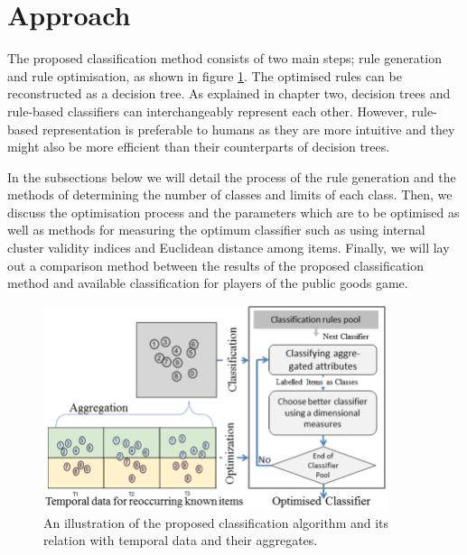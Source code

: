 \section{Approach}

The proposed classification method consists of two main steps; rule generation and rule optimisation, as shown in figure  \ref{fig:classificationProcess}. The optimised rules can be reconstructed as a decision tree.  As explained in chapter two, decision trees and rule-based classifiers can interchangeably represent each other. However, rule-based representation is preferable to humans as they are more intuitive and they might also be more efficient than their counterparts of decision trees.

In the subsections below we will detail the process of the rule generation and the methods of determining the number of classes and limits of each class. Then, we discuss the optimisation process and the parameters which are to be optimised as well as methods for measuring the optimum classifier such as using internal cluster validity indices and Euclidean distance among items. Finally, we will lay out a comparison method between the results of the proposed classification method and available classification for players of the public goods game.

\begin{figure}[!h]
    \centering
    \includegraphics[width=0.9\textwidth]{images/chapter5/classificationProcess.png}
    \caption{An illustration of the proposed classification algorithm and its relation with temporal data and their aggregates.}
    \label{fig:classificationProcess}
\end{figure}



